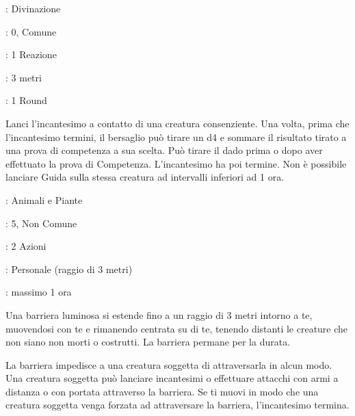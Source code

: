 \begin{multicols}{2}
\noindent\colorbox{OBSSgold!10}{
\begin{minipage}{0.95\linewidth}
\begin{description}[noitemsep, topsep=0pt, parsep=0pt, partopsep=0pt, leftmargin=0cm, labelwidth=1.3cm]
	\item[\textbf{Lista}]: Divinazione
	\item[\textbf{Livello}]: 0, Comune
	\item[\textbf{Lancio}]: 1 Reazione
	\item[\textbf{Gittata}]: 3 metri
		\item[\textbf{Durata}]: 1 Round
\end{description}
\end{minipage}}\smallskip

Lanci l'incantesimo a contatto di una creatura consenziente. Una volta, prima che l'incantesimo termini, il bersaglio può tirare un d4 e sommare il risultato tirato a una prova di competenza a sua scelta. Può tirare il dado prima o dopo aver effettuato la prova di Competenza. L'incantesimo ha poi termine. Non è possibile lanciare Guida sulla stessa creatura ad intervalli inferiori ad 1 ora.

\noindent\colorbox{OBSSgold!10}{
\begin{minipage}{0.95\linewidth}
\begin{description}[noitemsep, topsep=0pt, parsep=0pt, partopsep=0pt, leftmargin=0cm, labelwidth=1.3cm]
	\item[\textbf{Lista}]: Animali e Piante
	\item[\textbf{Livello}]: 5, Non Comune
	\item[\textbf{Lancio}]: 2 Azioni
	\item[\textbf{Gittata}]: Personale (raggio di 3 metri)
	\item[\textbf{Durata}]: massimo 1 ora
\end{description}
\end{minipage}}\smallskip

Una barriera luminosa si estende fino a un raggio di 3 metri intorno a te, muovendosi con te e rimanendo centrata su di te, tenendo distanti le creature che non siano non morti o costrutti. La barriera permane per la durata.

La barriera impedisce a una creatura soggetta di attraversarla in alcun modo. Una creatura soggetta può lanciare incantesimi o effettuare attacchi con armi a distanza o con portata attraverso la barriera. Se ti muovi in modo che una creatura soggetta venga forzata ad attraversare la barriera, l'incantesimo termina.


\end{multicols}
